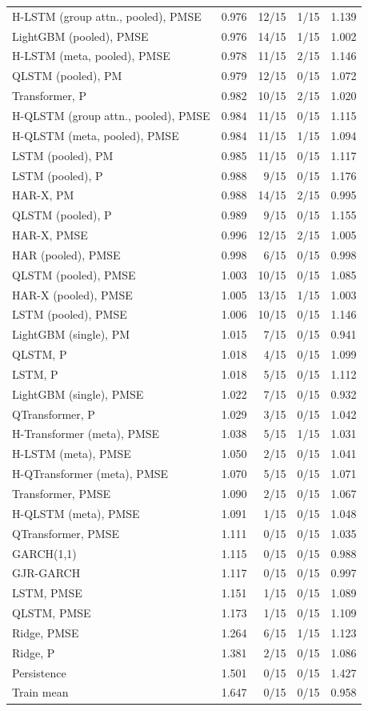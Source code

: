 \begin{tabular}{lrrrr}
H-LSTM (group attn., pooled), PMSE & 0.976 & 12/15 & 1/15 & 1.139 \\
LightGBM (pooled), PMSE & 0.976 & 14/15 & 1/15 & 1.002 \\
H-LSTM (meta, pooled), PMSE & 0.978 & 11/15 & 2/15 & 1.146 \\
QLSTM (pooled), PM & 0.979 & 12/15 & 0/15 & 1.072 \\
Transformer, P & 0.982 & 10/15 & 2/15 & 1.020 \\
H-QLSTM (group attn., pooled), PMSE & 0.984 & 11/15 & 0/15 & 1.115 \\
H-QLSTM (meta, pooled), PMSE & 0.984 & 11/15 & 1/15 & 1.094 \\
LSTM (pooled), PM & 0.985 & 11/15 & 0/15 & 1.117 \\
LSTM (pooled), P & 0.988 & 9/15 & 0/15 & 1.176 \\
HAR-X, PM & 0.988 & 14/15 & 2/15 & 0.995 \\
QLSTM (pooled), P & 0.989 & 9/15 & 0/15 & 1.155 \\
HAR-X, PMSE & 0.996 & 12/15 & 2/15 & 1.005 \\
HAR (pooled), PMSE & 0.998 & 6/15 & 0/15 & 0.998 \\
QLSTM (pooled), PMSE & 1.003 & 10/15 & 0/15 & 1.085 \\
HAR-X (pooled), PMSE & 1.005 & 13/15 & 1/15 & 1.003 \\
LSTM (pooled), PMSE & 1.006 & 10/15 & 0/15 & 1.146 \\
LightGBM (single), PM & 1.015 & 7/15 & 0/15 & 0.941 \\
QLSTM, P & 1.018 & 4/15 & 0/15 & 1.099 \\
LSTM, P & 1.018 & 5/15 & 0/15 & 1.112 \\
LightGBM (single), PMSE & 1.022 & 7/15 & 0/15 & 0.932 \\
QTransformer, P & 1.029 & 3/15 & 0/15 & 1.042 \\
H-Transformer (meta), PMSE & 1.038 & 5/15 & 1/15 & 1.031 \\
H-LSTM (meta), PMSE & 1.050 & 2/15 & 0/15 & 1.041 \\
H-QTransformer (meta), PMSE & 1.070 & 5/15 & 0/15 & 1.071 \\
Transformer, PMSE & 1.090 & 2/15 & 0/15 & 1.067 \\
H-QLSTM (meta), PMSE & 1.091 & 1/15 & 0/15 & 1.048 \\
QTransformer, PMSE & 1.111 & 0/15 & 0/15 & 1.035 \\
GARCH(1,1) & 1.115 & 0/15 & 0/15 & 0.988 \\
GJR-GARCH & 1.117 & 0/15 & 0/15 & 0.997 \\
LSTM, PMSE & 1.151 & 1/15 & 0/15 & 1.089 \\
QLSTM, PMSE & 1.173 & 1/15 & 0/15 & 1.109 \\
Ridge, PMSE & 1.264 & 6/15 & 1/15 & 1.123 \\
Ridge, P & 1.381 & 2/15 & 0/15 & 1.086 \\
Persistence & 1.501 & 0/15 & 0/15 & 1.427 \\
Train mean & 1.647 & 0/15 & 0/15 & 0.958 \\
\bottomrule
\end{tabular}
